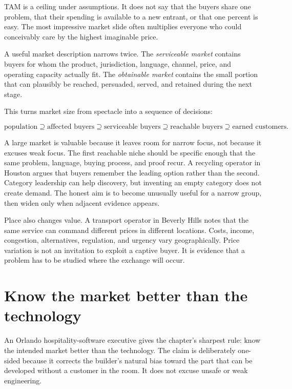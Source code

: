 TAM is a ceiling under assumptions. It does not say that the buyers share one
problem, that their spending is available to a new entrant, or that one percent
is easy. The most impressive market slide often multiplies everyone who could
conceivably care by the highest imaginable price.

A useful market description narrows twice. The \emph{serviceable market}
contains buyers for whom the product, jurisdiction, language, channel, price,
and operating capacity actually fit. The \emph{obtainable market} contains the
small portion that can plausibly be reached, persuaded, served, and retained
during the next stage.

This turns market size from spectacle into a sequence of decisions:

\begin{equation}
\text{population} \supseteq \text{affected buyers}
\supseteq \text{serviceable buyers} \supseteq \text{reachable buyers}
\supseteq \text{earned customers}.
\end{equation}

A large market is valuable because it leaves room for narrow focus, not because
it excuses weak focus. The first reachable niche should be specific enough that
the same problem, language, buying process, and proof recur. A recycling
operator in Houston argues that buyers remember the leading option rather than
the second. Category leadership can help discovery, but inventing an empty
category does not create demand. The honest aim is to become unusually useful
for a narrow group, then widen only when adjacent evidence appears.

Place also changes value. A transport operator in Beverly Hills notes that the
same service can command different prices in different locations. Costs,
income, congestion, alternatives, regulation, and urgency vary geographically.
Price variation is not an invitation to exploit a captive buyer. It is evidence
that a problem has to be studied where the exchange will occur.

\section{Know the market better than the technology}

An Orlando hospitality-software executive gives the chapter's sharpest rule:
know the intended market better than the technology. The claim is deliberately
one-sided because it corrects the builder's natural bias toward the part that
can be developed without a customer in the room. It does not excuse unsafe or
weak engineering.

